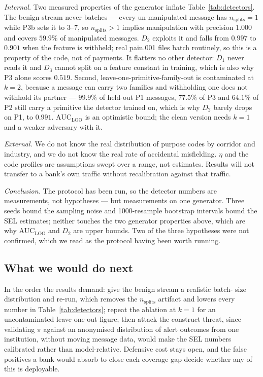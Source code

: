 \documentclass[conference]{IEEEtran}
\begin{document}
\emph{Internal.} Two measured properties of the generator inflate Table~\ref{tab:detectors}.
The benign stream never batches --- every un-manipulated message has
$n_{\mathrm{splits}}=1$ while P3b sets it to 3--7, so
$n_{\mathrm{splits}}>1$ implies manipulation with precision $1.000$ and
covers $59.9\%$ of manipulated messages. $D_2$ exploits it and falls from
$0.997$ to $0.901$ when the feature is withheld; real pain.001 files batch
routinely, so this is a property of the code, not of payments. It flatters
no other detector: $D_1$ never reads it and $D_3$ cannot split on a feature
constant in training, which is also why P3 alone scores $0.519$. Second,
leave-one-primitive-family-out is contaminated at $k=2$, because a message
can carry two families and withholding one does not withhold its partner ---
$99.9\%$ of held-out P1 messages, $77.5\%$ of P3 and $64.1\%$ of P2 still
carry a primitive the detector trained on, which is why $D_2$ barely drops
on P1, to $0.991$. AUC$_\mathrm{LOO}$ is an optimistic bound; the clean
version needs $k=1$ and a weaker adversary with it.

\emph{External.} We do not know the real distribution of purpose codes by
corridor and industry, and we do not know the real rate of accidental
misfielding. $\eta$ and the code profiles are assumptions swept over a range,
not estimates. Results will not transfer to a bank's own traffic without
recalibration against that traffic.

\emph{Conclusion.} The protocol has been run, so the detector numbers are
measurements, not hypotheses --- but measurements on one generator. Three
seeds bound the sampling noise and 1000-resample bootstrap intervals bound
the SEL estimates; neither touches the two generator properties above, which
are why AUC$_\mathrm{LOO}$ and $D_2$ are upper bounds. Two of the three
hypotheses were not confirmed, which we read as the protocol having been
worth running.

\subsection{What we would do next}
In the order the results demand: give the benign stream a realistic batch-
size distribution and re-run, which removes the $n_{\mathrm{splits}}$
artifact and lowers every number in Table~\ref{tab:detectors}; repeat the
ablation at $k=1$ for an uncontaminated leave-one-out figure; then attack
the construct threat, since validating $\pi$ against an anonymised
distribution of alert outcomes from one institution, without moving message
data, would make the SEL numbers calibrated rather than model-relative.
Defensive cost stays open, and the false positives a bank would absorb to
close each coverage gap decide whether any of this is deployable.
\end{document}
